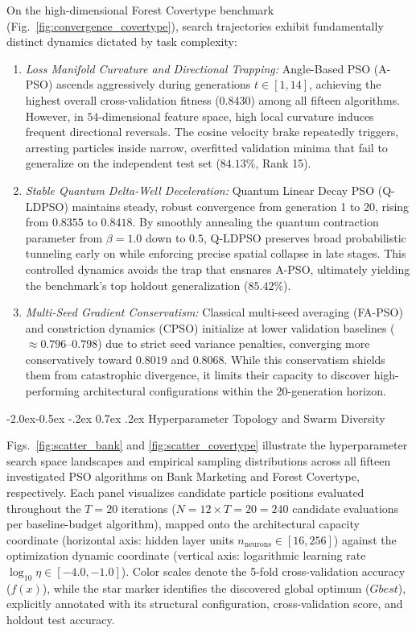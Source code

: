 \documentclass[10pt]{article}
\makeatletter
\renewcommand\subsection{\@startsection{subsection}{2}{\z@}%
                                     {-2.0ex\@plus -0.5ex \@minus -.2ex}%
                                     {0.7ex \@plus .2ex}%
                                     {\normalfont\itshape\fontsize{8.0pt}{10.5pt}\selectfont}}
\makeatother
\begin{document}
On the high-dimensional Forest Covertype benchmark (Fig.~\ref{fig:convergence_covertype}), search trajectories exhibit fundamentally distinct dynamics dictated by task complexity:
\begin{enumerate}
    \item \textit{Loss Manifold Curvature and Directional Trapping:} Angle-Based PSO (A-PSO) ascends aggressively during generations $t \in [1, 14]$, achieving the highest overall cross-validation fitness ($0.8430$) among all fifteen algorithms. However, in $54$-dimensional feature space, high local curvature induces frequent directional reversals. The cosine velocity brake repeatedly triggers, arresting particles inside narrow, overfitted validation minima that fail to generalize on the independent test set ($84.13\%$, Rank 15).
    \item \textit{Stable Quantum Delta-Well Deceleration:} Quantum Linear Decay PSO (Q-LDPSO) maintains steady, robust convergence from generation 1 to 20, rising from $0.8355$ to $0.8418$. By smoothly annealing the quantum contraction parameter from $\beta=1.0$ down to $0.5$, Q-LDPSO preserves broad probabilistic tunneling early on while enforcing precise spatial collapse in late stages. This controlled dynamics avoids the trap that ensnares A-PSO, ultimately yielding the benchmark's top holdout generalization ($85.42\%$).
    \item \textit{Multi-Seed Gradient Conservatism:} Classical multi-seed averaging (FA-PSO) and constriction dynamics (CPSO) initialize at lower validation baselines ($\approx 0.796$--$0.798$) due to strict seed variance penalties, converging more conservatively toward $0.8019$ and $0.8068$. While this conservatism shields them from catastrophic divergence, it limits their capacity to discover high-performing architectural configurations within the 20-generation horizon.
\end{enumerate}



\subsection{Hyperparameter Topology and Swarm Diversity}

Figs.~\ref{fig:scatter_bank} and \ref{fig:scatter_covertype} illustrate the hyperparameter search space landscapes and empirical sampling distributions across all fifteen investigated PSO algorithms on Bank Marketing and Forest Covertype, respectively. Each panel visualizes candidate particle positions evaluated throughout the $T=20$ iterations ($N=12 \times T=20 = 240$ candidate evaluations per baseline-budget algorithm), mapped onto the architectural capacity coordinate (horizontal axis: hidden layer units $n_{\mathrm{neurons}} \in [16, 256]$) against the optimization dynamic coordinate (vertical axis: logarithmic learning rate $\log_{10}\eta \in [-4.0, -1.0]$). Color scales denote the 5-fold cross-validation accuracy ($f(x)$), while the star marker identifies the discovered global optimum ($Gbest$), explicitly annotated with its structural configuration, cross-validation score, and holdout test accuracy.
\end{document}
